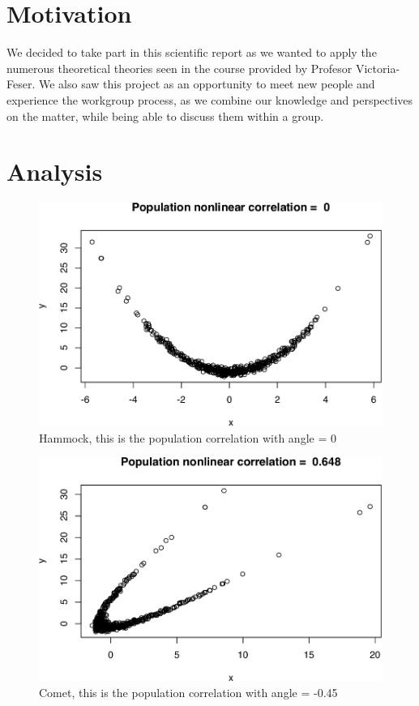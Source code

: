 \documentclass[11pt,]{article}
\begin{document}
\hypertarget{motivation}{%
\section{Motivation}\label{motivation}}

We decided to take part in this scientific report as we wanted to apply
the numerous theoretical theories seen in the course provided by
Profesor Victoria-Feser. We also saw this project as an opportunity to
meet new people and experience the workgroup process, as we combine our
knowledge and perspectives on the matter, while being able to discuss
them within a group.

\hypertarget{analysis}{%
\section{Analysis}\label{analysis}}

\begin{figure}

{\centering \includegraphics[width=0.5\linewidth]{RapportSTAT_files/figure-latex/nonlinear_q1-1} 

}

\caption{Hammock, this is the population correlation with angle = 0}\label{fig:nonlinear_q1}
\end{figure}

\begin{figure}

{\centering \includegraphics[width=0.5\linewidth]{RapportSTAT_files/figure-latex/nonlinear_q2-1} 

}

\caption{Comet, this is the population correlation with angle = -0.45}\label{fig:nonlinear_q2}
\end{figure}
\end{document}
